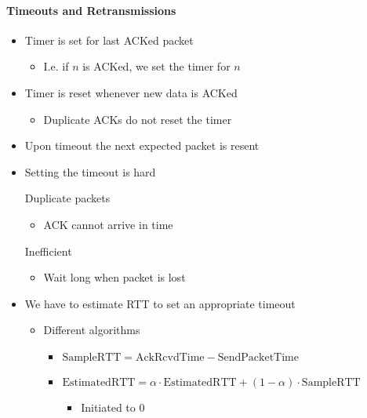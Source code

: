 \paragraph{Timeouts and Retransmissions}
\begin{itemize}
    \item Timer is set for last ACKed packet
        \begin{itemize}
            \item I.e. if $n$ is ACKed, we set the timer for $n$
        \end{itemize}
    \item Timer is reset whenever new data is ACKed
        \begin{itemize}
            \item Duplicate ACKs do not reset the timer
        \end{itemize}
    \item Upon timeout the next expected packet is resent
    \item Setting the timeout is hard
        \begin{itemize}
             Duplicate packets
                \begin{itemize}
                    \item ACK cannot arrive in time
                \end{itemize}
             Inefficient
                \begin{itemize}
                    \item Wait long when packet is lost
                \end{itemize}
        \end{itemize}
    \item We have to estimate RTT to set an appropriate timeout
        \begin{itemize}
            \item Different algorithms
                \begin{itemize}
                     Measure RTT in regular intervals and combine it with previous measurements
                    \item $\text{SampleRTT} = \text{AckRcvdTime} - \text{SendPacketTime}$
                    \item $\text{EstimatedRTT} = \alpha \cdot \text{EstimatedRTT} + (1 - \alpha) \cdot \text{SampleRTT}$
                        \begin{itemize}
                            \item Initiated to $0$

\end{itemize}
\end{itemize}
\end{itemize}
\end{itemize}
